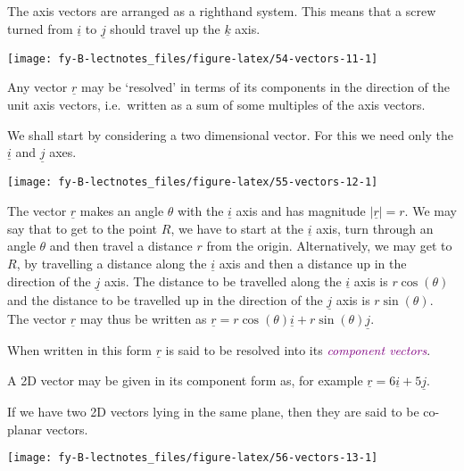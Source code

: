 \documentclass[
  english,
  11pt,
  oneside]{book}
\newcommand{\slide}{}
\theoremstyle{definition}
\theoremstyle{definition}
\theoremstyle{definition}
\theoremstyle{definition}
\theoremstyle{remark}
\begin{document}
The axis vectors are arranged as a righthand system. This means that a screw turned from \(\underline i\) to \(\underline j\) should travel up the \(\underline k\) axis.

\begin{center}\texttt{[image: fy-B-lectnotes\_files/figure-latex/54-vectors-11-1]} \end{center}

\slide

Any vector \(\underline{r}\) may be `resolved' in terms of its components in the direction of the unit axis vectors, i.e.~written as a sum of some multiples of the axis vectors.

We shall start by considering a two dimensional vector. For this we need only the \(\underline i\) and \(\underline j\) axes.

\begin{center}\texttt{[image: fy-B-lectnotes\_files/figure-latex/55-vectors-12-1]} \end{center}

\slide

The vector \(\underline r\) makes an angle \(\theta\) with the \(\underline i\) axis and has magnitude \(|\underline r| = r\). We may say that to get to the point \(R\), we have to start at the \(\underline i\) axis, turn through an angle \(\theta\) and then travel a distance \(r\) from the origin. Alternatively, we may get to \(R\), by travelling a distance along the \(\underline i\) axis and then a distance up in the direction of the \(\underline j\) axis. The distance to be travelled along the \(\underline i\) axis is \(r\cos(\theta)\) and the distance to be travelled up in the direction of the \(\underline j\) axis is \(r\sin(\theta)\). The vector \(\underline r\) may thus be written as \(\underline r = r\cos(\theta) \underline i + r\sin(\theta)\underline j\).

When written in this form \(\underline r\) is said to be resolved into its \textcolor{purple}{\em component vectors}.

\slide

A 2D vector may be given in its component form as, for example \(\underline r = 6\underline i + 5\underline j\).

If we have two 2D vectors lying in the same plane, then they are said to be co-planar vectors.

\begin{center}\texttt{[image: fy-B-lectnotes\_files/figure-latex/56-vectors-13-1]} \end{center}
\end{document}
